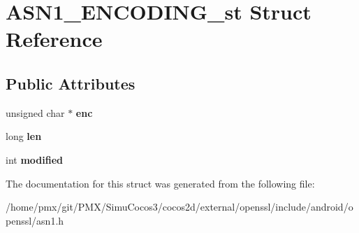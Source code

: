 \hypertarget{structASN1__ENCODING__st}{}\section{A\+S\+N1\+\_\+\+E\+N\+C\+O\+D\+I\+N\+G\+\_\+st Struct Reference}
\label{structASN1__ENCODING__st}
\subsection*{Public Attributes}
\begin{DoxyCompactItemize}
\item 
\mbox{\label{structASN1__ENCODING__st_a94c3ba76a6878d79540f3f86c83cd622}} 
unsigned char $\ast$ {\bfseries enc}
\item 
\mbox{\label{structASN1__ENCODING__st_a1d4db56d95977ef9daad570912a187cc}} 
long {\bfseries len}
\item 
\mbox{\label{structASN1__ENCODING__st_a81a85e0aa68d4a31fe277f88d7f1fdd5}} 
int {\bfseries modified}
\end{DoxyCompactItemize}


The documentation for this struct was generated from the following file\+:\begin{DoxyCompactItemize}
\item 
/home/pmx/git/\+P\+M\+X/\+Simu\+Cocos3/cocos2d/external/openssl/include/android/openssl/asn1.\+h\end{DoxyCompactItemize}
